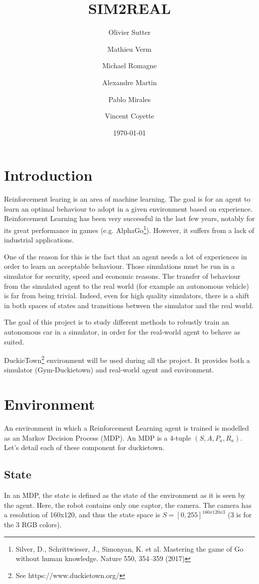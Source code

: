 \documentclass[12pt]{article}
\title{SIM2REAL}
\author{Olivier Sutter \and Mathieu Verm \and Michael Romagne \and Alexandre Martin \and Pablo Mirales \and Vincent Coyette}
\date{\today}
\begin{document}
\maketitle{}

\tableofcontents

\clearpage
\newpage

\section{Introduction}
Reinforcement learing is an area of machine learning. The goal is for an agent to learn an optimal behaviour to adopt in a given environment based on experience. Reinforcement Learning has been very successful in the last few years, notably for its great performance in games (e.g. AlphaGo\footnote{Silver, D., Schrittwieser, J., Simonyan, K. et al. Mastering the game of Go without human knowledge. Nature 550, 354–359 (2017)}). However, it suffers from a lack of industrial applications.

One of the reason for this is the fact that an agent needs a lot of experiences in order to learn an acceptable behaviour. Those simulations must be run in a simulator for security, speed and economic reasons. The transfer of behaviour from the simulated agent to the real world (for example an autonomous vehicle) is far from being trivial. Indeed, even for high quality simulators, there is a shift in both spaces of states and transitions between the simulator and the real world.

The goal of this project is to study different methods to robustly train an autonomous car in a simulator, in order for the real-world agent to behave as suited.


DuckieTown\footnote{See https://www.duckietown.org/} environment will be used during all the project. It provides both a simulator (Gym-Duckietown) and real-world agent and environment. 


\section{Environment}
An environment in which a Reinforcement Learning agent is trained is modelled as an Markov Decision Process (MDP). An MDP is a 4-tuple $(S, A, P_a, R_a)$. Let's detail each of these component for duckietown. 

\subsection{State}
In an MDP, the state is defined as the state of the environment as it is seen by the agent. Here, the robot contains only one captor, the camera. The camera has a resolution of 160x120, and thus the state space is $S = [0, 255]^{160x120x3}$ (3 is for the 3 RGB colors).
\end{document}
